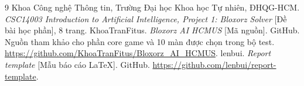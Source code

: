 \documentclass[12pt,a4paper]{article}
\begin{document}


\clearpage
{}
{}
\begin{thebibliography}{9}
 Khoa Công nghệ Thông tin, Trường Đại học Khoa học Tự nhiên, ĐHQG-HCM. \textit{CSC14003 Introduction to Artificial Intelligence, Project 1: Bloxorz Solver} [Đề bài học phần], 8 trang.
 KhoaTranFitus. \textit{Bloxorz AI HCMUS} [Mã nguồn]. GitHub. Nguồn tham khảo cho phần core game và 10 màn được chọn trong bộ test. \url{https://github.com/KhoaTranFitus/Bloxorz_AI_HCMUS}.
 lenbui. \textit{Report template} [Mẫu báo cáo LaTeX]. GitHub. \url{https://github.com/lenbui/report-template}.
\end{thebibliography}
\appendix

\end{document}

